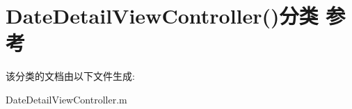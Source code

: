 \hypertarget{category_date_detail_view_controller_07_08}{\section{Date\-Detail\-View\-Controller()分类 参考}
\label{category_date_detail_view_controller_07_08}
}


该分类的文档由以下文件生成\-:\begin{DoxyCompactItemize}
\item 
Date\-Detail\-View\-Controller.\-m\end{DoxyCompactItemize}
